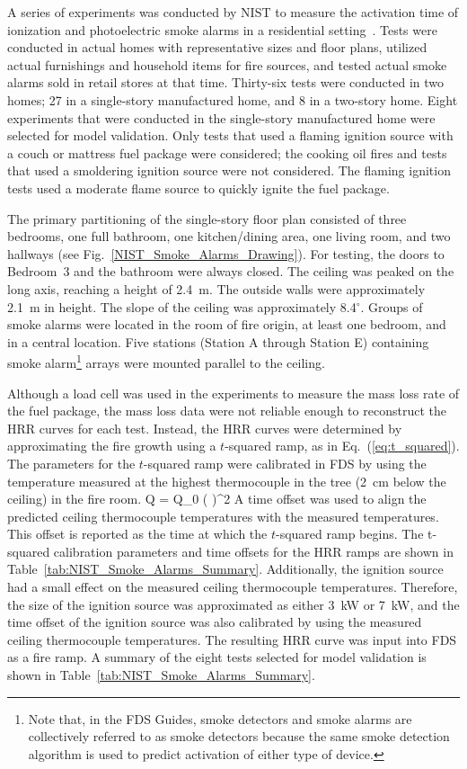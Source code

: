 A series of experiments was conducted by NIST to measure the activation time of ionization and photoelectric smoke alarms in a residential setting~\cite{Bukowski:1}. Tests were conducted in actual homes with representative sizes and floor plans, utilized actual furnishings and household items for fire sources, and tested actual smoke alarms sold in retail stores at that time. Thirty-six tests were conducted in two homes; 27 in a single-story manufactured home, and 8 in a two-story home. Eight experiments that were conducted in the single-story manufactured home were selected for model validation. Only tests that used a flaming ignition source with a couch or mattress fuel package were considered; the cooking oil fires and tests that used a smoldering ignition source were not considered. The flaming ignition tests used a moderate flame source to quickly ignite the fuel package.

The primary partitioning of the single-story floor plan consisted of three bedrooms, one full bathroom, one kitchen/dining area, one living room, and two hallways (see Fig.~\ref{NIST_Smoke_Alarms_Drawing}). For testing, the doors to Bedroom~3 and the bathroom were always closed. The ceiling was peaked on the long axis, reaching a height of 2.4~m. The outside walls were approximately 2.1~m in height. The slope of the ceiling was approximately 8.4$^\circ$. Groups of smoke alarms were located in the room of fire origin, at least one bedroom, and in a central location. Five stations (Station A through Station E) containing smoke alarm\footnote{Note that, in the FDS Guides, smoke detectors and smoke alarms are collectively referred to as smoke detectors because the same smoke detection algorithm is used to predict activation of either type of device.} arrays were mounted parallel to the ceiling.

Although a load cell was used in the experiments to measure the mass loss rate of the fuel package, the mass loss data were not reliable enough to reconstruct the HRR curves for each test. Instead, the HRR curves were determined by approximating the fire growth using a $t$-squared ramp, as in Eq.~(\ref{eq:t_squared}). The parameters for the $t$-squared ramp were calibrated in FDS by using the temperature measured at the highest thermocouple in the tree (2~cm below the ceiling) in the fire room.
\be
\dot Q = \dot Q_0 \left(  \right)^2
\label{eq:t_squared}
\ee
A time offset was used to align the predicted ceiling thermocouple temperatures with the measured temperatures. This offset is reported as the time at which the $t$-squared ramp begins. The t-squared calibration parameters and time offsets for the HRR ramps are shown in Table~\ref{tab:NIST_Smoke_Alarms_Summary}. Additionally, the ignition source had a small effect on the measured ceiling thermocouple temperatures. Therefore, the size of the ignition source was approximated as either 3~kW or 7~kW, and the time offset of the ignition source was also calibrated by using the measured ceiling thermocouple temperatures. The resulting HRR curve was input into FDS as a fire ramp. A summary of the eight tests selected for model validation is shown in Table~\ref{tab:NIST_Smoke_Alarms_Summary}.

